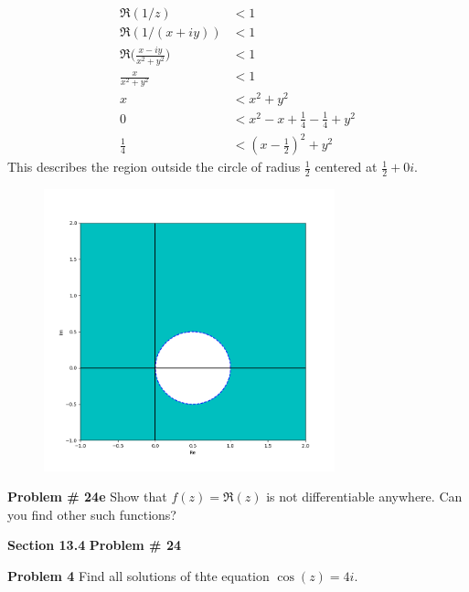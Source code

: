 \documentclass[12pt]{article}
\newcommand{\problem}[1]{\hspace{-4 ex} \large \textbf{Problem #1} }
\begin{document}
	\begin{align*}
		\Re(1/z) &< 1\\
		\Re(1/(x+iy)) &< 1\\
		\Re \Bigg(\frac{x-iy}{x^2+y^2} \Bigg) &< 1 \\
		\frac{x}{x^2+y^2} &< 1 \\
		x &< x^2 + y^2 \\
		0 &< x^2 - x + \tfrac{1}{4} - \tfrac{1}{4} + y^2 \\
		\tfrac{1}{4} &< (x-\tfrac{1}{2})^2 +y^2
	\end{align*}
	This describes the region outside the circle of radius $\tfrac{1}{2}$ centered at $\tfrac{1}{2} + 0i$.
	\begin{figure}[H]
		\includegraphics[width=0.75\textwidth]{hw10_figure_2}
		\centering
	\end{figure}

\bigbreak
\problem{\# 24e} Show that $f(z) = \Re(z)$ is not differentiable anywhere. Can you find other such functions?

\bigbreak
{\hspace{-4 ex} \large \textbf{Section 13.4}}\bigbreak
\problem{\# 24}

\bigbreak
\problem{4} Find all solutions of thte equation $\cos(z) = 4i$. \bigbreak
\end{document}
